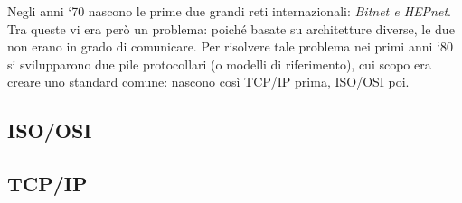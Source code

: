 \documentclass{subfiles}
\begin{document}
Negli anni `70 nascono le prime due grandi reti internazionali: \emph{Bitnet \emph{e} HEPnet}.
Tra queste vi era però un problema: poiché basate su architetture diverse, le due non erano in grado di comunicare.
Per risolvere tale problema nei primi anni `80 si svilupparono due pile protocollari (o modelli di riferimento),
cui scopo era creare uno standard comune: nascono così TCP/IP prima, ISO/OSI poi.

\subsection{ISO/OSI}


\subsection{TCP/IP}

\end{document}
